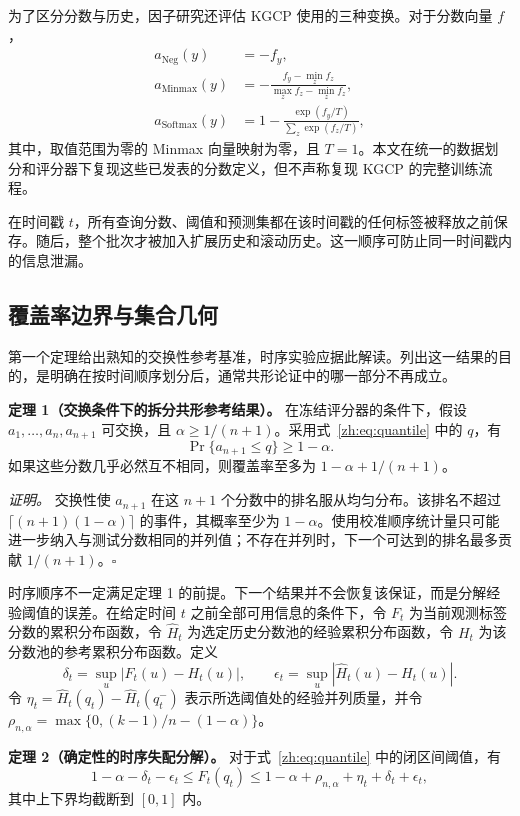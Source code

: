\documentclass[UTF8,a4paper,11pt]{ctexart}
\begin{document}
为了区分分数与历史，因子研究还评估 KGCP 使用的三种变换。对于分数向量 \(f\)，
\[
\begin{aligned}
 a_{\mathrm{Neg}}(y)&=-f_y,\\
 a_{\mathrm{Minmax}}(y)&=-\frac{f_y-\min_z f_z}{\max_z f_z-\min_z f_z},\\
 a_{\mathrm{Softmax}}(y)&=1-\frac{\exp(f_y/T)}{\sum_z\exp(f_z/T)},
\end{aligned}
\tag{3}\label{zh:eq:scores}
\]
其中，取值范围为零的 Minmax 向量映射为零，且 \(T=1\)。本文在统一的数据划分和评分器下复现这些已发表的分数定义，但不声称复现 KGCP 的完整训练流程。

在时间戳 \(t\)，所有查询分数、阈值和预测集都在该时间戳的任何标签被释放之前保存。随后，整个批次才被加入扩展历史和滚动历史。这一顺序可防止同一时间戳内的信息泄漏。

\subsection{覆盖率边界与集合几何}

第一个定理给出熟知的交换性参考基准，时序实验应据此解读。列出这一结果的目的，是明确在按时间顺序划分后，通常共形论证中的哪一部分不再成立\cite{vovk2005algorithmic,angelopoulos2023gentle}。

\noindent\textbf{定理 1（交换条件下的拆分共形参考结果）。}\quad
在冻结评分器的条件下，假设 \(a_1,\ldots,a_n,a_{n+1}\) 可交换，且 \(\alpha\ge 1/(n+1)\)。采用式~\eqref{zh:eq:quantile} 中的 \(q\)，有
\[
 \Pr\{a_{n+1}\le q\}\ge 1-\alpha.
 \tag{4}\label{zh:eq:exchangeable}
\]
如果这些分数几乎必然互不相同，则覆盖率至多为 \(1-\alpha+1/(n+1)\)。

\emph{证明。}
交换性使 \(a_{n+1}\) 在这 \(n+1\) 个分数中的排名服从均匀分布。该排名不超过 \(\lceil(n+1)(1-\alpha)\rceil\) 的事件，其概率至少为 \(1-\alpha\)。使用校准顺序统计量只可能进一步纳入与测试分数相同的并列值；不存在并列时，下一个可达到的排名最多贡献 \(1/(n+1)\)。\hfill\(\square\)

时序顺序不一定满足定理 1 的前提。下一个结果并不会恢复该保证，而是分解经验阈值的误差。在给定时间 \(t\) 之前全部可用信息的条件下，令 \(F_t\) 为当前观测标签分数的累积分布函数，令 \(\widehat H_t\) 为选定历史分数池的经验累积分布函数，令 \(H_t\) 为该分数池的参考累积分布函数。定义
\[
 \delta_t=\sup_u|F_t(u)-H_t(u)|,\qquad
 \epsilon_t=\sup_u|\widehat H_t(u)-H_t(u)|.
\]
令 \(\eta_t=\widehat H_t(q_t)-\widehat H_t(q_t^-)\) 表示所选阈值处的经验并列质量，并令 \(\rho_{n,\alpha}=\max\{0,(k-1)/n-(1-\alpha)\}\)。

\noindent\textbf{定理 2（确定性的时序失配分解）。}\quad
对于式~\eqref{zh:eq:quantile} 中的闭区间阈值，有
\[
 1-\alpha-\delta_t-\epsilon_t
 \le F_t(q_t)\le
 1-\alpha+\rho_{n,\alpha}+\eta_t+\delta_t+\epsilon_t,
 \tag{5}\label{zh:eq:decomposition}
\]
其中上下界均截断到 \([0,1]\) 内。
\end{document}
